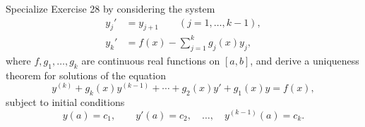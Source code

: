 \begin{questions}
  \question Specialize Exercise 28 by considering the system
  \begin{align*}
    y_j' &= y_{j+1} \qquad (j=1,\ldots,k-1), \\
    y_k' &= f(x) - \sum_{j=1}^k g_j(x)y_j,
  \end{align*}
  where $f,g_1,\ldots,g_k$ are continuous real functions on $[a,b]$, and derive a uniqueness theorem for solutions of the equation
  \[ y^{(k)} + g_k(x)y^{(k-1)} + \cdots + g_2(x)y' + g_1(x)y = f(x), \]
  subject to initial conditions
  \[ y(a)=c_1, \qquad y'(a) = c_2, \quad \ldots, \quad y^{(k-1)}(a) = c_k. \]
\end{questions}

